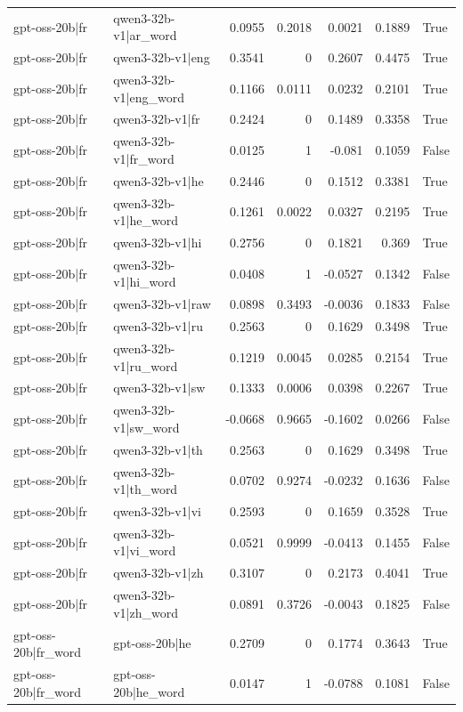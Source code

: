 \begin{table}
\begin{tabular}{l l r r r r l}
gpt-oss-20b|fr & qwen3-32b-v1|ar_word & 0.0955 & 0.2018 & 0.0021 & 0.1889 & True \\
gpt-oss-20b|fr & qwen3-32b-v1|eng & 0.3541 & 0 & 0.2607 & 0.4475 & True \\
gpt-oss-20b|fr & qwen3-32b-v1|eng_word & 0.1166 & 0.0111 & 0.0232 & 0.2101 & True \\
gpt-oss-20b|fr & qwen3-32b-v1|fr & 0.2424 & 0 & 0.1489 & 0.3358 & True \\
gpt-oss-20b|fr & qwen3-32b-v1|fr_word & 0.0125 & 1 & -0.081 & 0.1059 & False \\
gpt-oss-20b|fr & qwen3-32b-v1|he & 0.2446 & 0 & 0.1512 & 0.3381 & True \\
gpt-oss-20b|fr & qwen3-32b-v1|he_word & 0.1261 & 0.0022 & 0.0327 & 0.2195 & True \\
gpt-oss-20b|fr & qwen3-32b-v1|hi & 0.2756 & 0 & 0.1821 & 0.369 & True \\
gpt-oss-20b|fr & qwen3-32b-v1|hi_word & 0.0408 & 1 & -0.0527 & 0.1342 & False \\
gpt-oss-20b|fr & qwen3-32b-v1|raw & 0.0898 & 0.3493 & -0.0036 & 0.1833 & False \\
gpt-oss-20b|fr & qwen3-32b-v1|ru & 0.2563 & 0 & 0.1629 & 0.3498 & True \\
gpt-oss-20b|fr & qwen3-32b-v1|ru_word & 0.1219 & 0.0045 & 0.0285 & 0.2154 & True \\
gpt-oss-20b|fr & qwen3-32b-v1|sw & 0.1333 & 0.0006 & 0.0398 & 0.2267 & True \\
gpt-oss-20b|fr & qwen3-32b-v1|sw_word & -0.0668 & 0.9665 & -0.1602 & 0.0266 & False \\
gpt-oss-20b|fr & qwen3-32b-v1|th & 0.2563 & 0 & 0.1629 & 0.3498 & True \\
gpt-oss-20b|fr & qwen3-32b-v1|th_word & 0.0702 & 0.9274 & -0.0232 & 0.1636 & False \\
gpt-oss-20b|fr & qwen3-32b-v1|vi & 0.2593 & 0 & 0.1659 & 0.3528 & True \\
gpt-oss-20b|fr & qwen3-32b-v1|vi_word & 0.0521 & 0.9999 & -0.0413 & 0.1455 & False \\
gpt-oss-20b|fr & qwen3-32b-v1|zh & 0.3107 & 0 & 0.2173 & 0.4041 & True \\
gpt-oss-20b|fr & qwen3-32b-v1|zh_word & 0.0891 & 0.3726 & -0.0043 & 0.1825 & False \\
gpt-oss-20b|fr_word & gpt-oss-20b|he & 0.2709 & 0 & 0.1774 & 0.3643 & True \\
gpt-oss-20b|fr_word & gpt-oss-20b|he_word & 0.0147 & 1 & -0.0788 & 0.1081 & False \\

\end{tabular}
\end{table}
